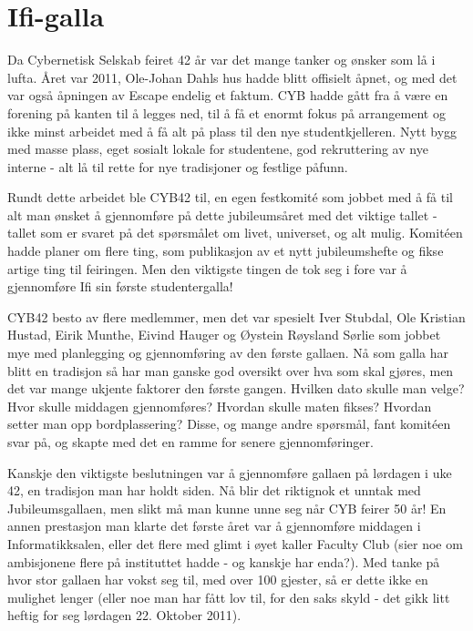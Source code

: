\chapter{Ifi-galla}

Da Cybernetisk Selskab feiret 42 år var det mange tanker og ønsker som lå i lufta. Året var 2011, Ole-Johan Dahls hus hadde blitt offisielt åpnet, og med det var også åpningen av Escape endelig et faktum. CYB hadde gått fra å være en forening på kanten til å legges ned, til å få et enormt fokus på arrangement og ikke minst arbeidet med å få alt på plass til den nye studentkjelleren. Nytt bygg med masse plass, eget sosialt lokale for studentene, god rekruttering av nye interne - alt lå til rette for nye tradisjoner og festlige påfunn.

Rundt dette arbeidet ble CYB42 til, en egen festkomité som jobbet med å få til alt man ønsket å gjennomføre på dette jubileumsåret med det viktige tallet - tallet som er svaret på det spørsmålet om livet, universet, og alt mulig. Komitéen hadde planer om flere ting, som publikasjon av et nytt jubileumshefte og fikse artige ting til feiringen. Men den viktigste tingen de tok seg i fore var å gjennomføre Ifi sin første studentergalla!

CYB42 besto av flere medlemmer, men det var spesielt Iver Stubdal, Ole Kristian Hustad, Eirik Munthe, Eivind Hauger og Øystein Røysland Sørlie som jobbet mye med planlegging og gjennomføring av den første gallaen. Nå som galla har blitt en tradisjon så har man ganske god oversikt over hva som skal gjøres, men det var mange ukjente faktorer den første gangen. Hvilken dato skulle man velge? Hvor skulle middagen gjennomføres? Hvordan skulle maten fikses? Hvordan setter man opp bordplassering? Disse, og mange andre spørsmål, fant komitéen svar på, og skapte med det en ramme for senere gjennomføringer.

Kanskje den viktigste beslutningen var å gjennomføre gallaen på lørdagen i uke 42, en tradisjon man har holdt siden. Nå blir det riktignok et unntak med Jubileumsgallaen, men slikt må man kunne unne seg når CYB feirer 50 år! En annen prestasjon man klarte det første året var å gjennomføre middagen i Informatikksalen, eller det flere med glimt i øyet kaller Faculty Club (sier noe om ambisjonene flere på instituttet hadde - og kanskje har enda?). Med tanke på hvor stor gallaen har vokst seg til, med over 100 gjester, så er dette ikke en mulighet lenger (eller noe man har fått lov til, for den saks skyld - det gikk litt heftig for seg lørdagen 22. Oktober 2011).

